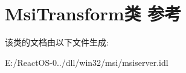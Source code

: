 \hypertarget{class_msi_transform}{}\section{Msi\+Transform类 参考}
\label{class_msi_transform}


该类的文档由以下文件生成\+:\begin{DoxyCompactItemize}
\item 
E\+:/\+React\+O\+S-\/0../dll/win32/msi/msiserver.\+idl\end{DoxyCompactItemize}
